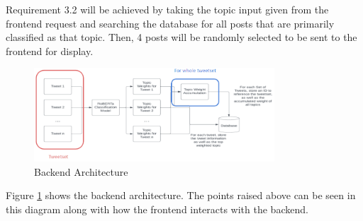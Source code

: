 Requirement 3.2 will be achieved by taking the topic input given from the frontend request and searching the database for all posts that
are primarily classified as that topic. Then, 4 posts will be randomly selected to be sent to the frontend for display.
\begin{figure}
    \centering
    \includegraphics[width=0.8\textwidth]{../images/backend.png}
    \caption{Backend Architecture}
    \label{fig:backend}
\end{figure}
Figure \ref{fig:backend} shows the backend architecture. The points raised above can be seen in this diagram along with how the frontend
interacts with the backend.
